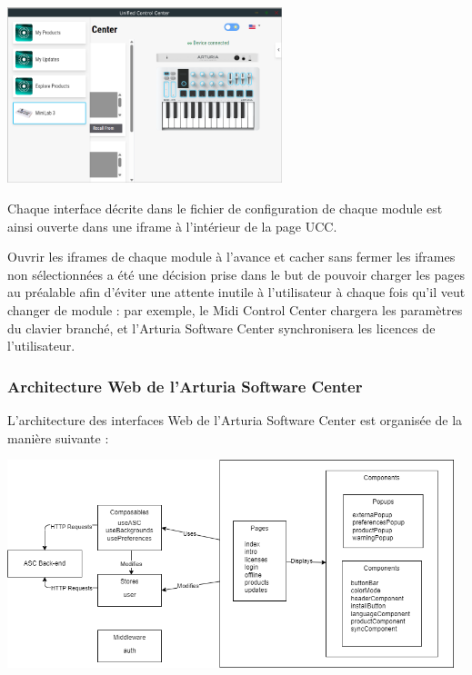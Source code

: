 \documentclass[francais]{rapportPFE}  %
\begin{document}
\begin{center}
    \centering
    \includegraphics[width=8cm]{graphics/menu_deplie.png}
    \label{fig:test1}
    \end{center}

Chaque interface décrite dans le fichier de configuration de chaque module est ainsi ouverte dans une iframe à l'intérieur de la page UCC.

Ouvrir les iframes de chaque module à l'avance et cacher sans fermer les iframes non sélectionnées a été une décision prise dans le but de pouvoir charger les pages au préalable afin d'éviter une attente inutile à l'utilisateur à chaque fois qu'il veut changer de module : par exemple, le Midi Control Center chargera les paramètres du clavier branché, et l'Arturia Software Center synchronisera les licences de l'utilisateur.

\subsubsection{Architecture Web de l'Arturia Software Center}

L'architecture des interfaces Web de l'Arturia Software Center est organisée de la manière suivante : 

\begin{center}
    \centering
    \includegraphics[width=13cm]{graphics/ascnuxt.png}
    \label{fig:test1}
\end{center}
\end{document}

